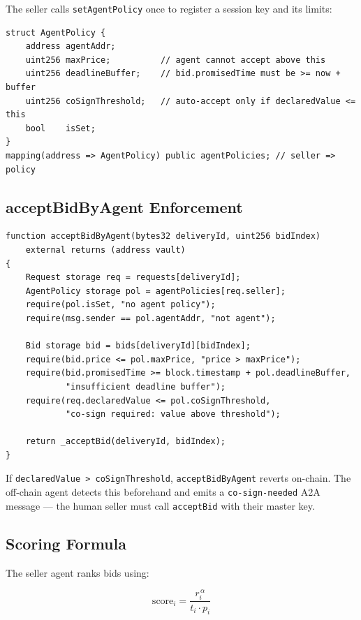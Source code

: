 \documentclass[12pt,a4paper]{article}
\begin{document}
The seller calls \texttt{setAgentPolicy} once to register a session key and its limits:

\begin{lstlisting}[language=Solidity, caption=Agent policy storage]
struct AgentPolicy {
    address agentAddr;
    uint256 maxPrice;          // agent cannot accept above this
    uint256 deadlineBuffer;    // bid.promisedTime must be >= now + buffer
    uint256 coSignThreshold;   // auto-accept only if declaredValue <= this
    bool    isSet;
}
mapping(address => AgentPolicy) public agentPolicies; // seller => policy
\end{lstlisting}

\subsection{acceptBidByAgent Enforcement}

\begin{lstlisting}[language=Solidity, caption=Policy enforcement in acceptBidByAgent]
function acceptBidByAgent(bytes32 deliveryId, uint256 bidIndex)
    external returns (address vault)
{
    Request storage req = requests[deliveryId];
    AgentPolicy storage pol = agentPolicies[req.seller];
    require(pol.isSet, "no agent policy");
    require(msg.sender == pol.agentAddr, "not agent");

    Bid storage bid = bids[deliveryId][bidIndex];
    require(bid.price <= pol.maxPrice, "price > maxPrice");
    require(bid.promisedTime >= block.timestamp + pol.deadlineBuffer,
            "insufficient deadline buffer");
    require(req.declaredValue <= pol.coSignThreshold,
            "co-sign required: value above threshold");

    return _acceptBid(deliveryId, bidIndex);
}
\end{lstlisting}

If \texttt{declaredValue > coSignThreshold}, \texttt{acceptBidByAgent} reverts on-chain. The off-chain agent detects this beforehand and emits a \texttt{co-sign-needed} A2A message — the human seller must call \texttt{acceptBid} with their master key.

\subsection{Scoring Formula}

The seller agent ranks bids using:

\[
\text{score}_i = \frac{r_i^{\,\alpha}}{t_i \cdot p_i}
\]
\end{document}
